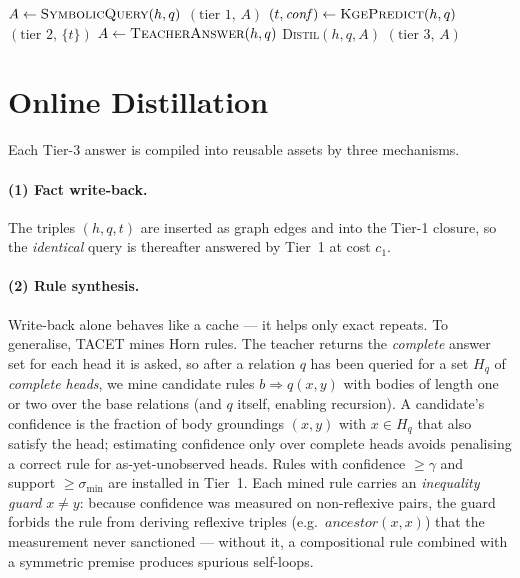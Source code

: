 \documentclass[11pt]{article}
\theoremstyle{plain}
\begin{document}
\begin{algorithm}[t]
\caption{TACET query routing with distillation}
\label{alg:route}
\begin{algorithmic}[1]
  \State $A \gets \textsc{SymbolicQuery}(h,q)$
   \Return $(\text{tier }1,\,A)$ \EndIf
  \State $(t,\mathit{conf}) \gets \textsc{KgePredict}(h,q)$
     \State \Return $(\text{tier }2,\,\{t\})$
  \EndIf
  \State $A \gets \textsc{TeacherAnswer}(h,q)$
  \State \textsc{Distil}$(h,q,A)$ 
  \State \Return $(\text{tier }3,\,A)$
\EndFunction
\end{algorithmic}
\end{algorithm}

\section{Online Distillation}
\label{sec:distill}

Each Tier-3 answer is compiled into reusable assets by three mechanisms.

\paragraph{(1) Fact write-back.} The triples $(h,q,t)$ are inserted as
graph edges and into the Tier-1 closure, so the \emph{identical} query is
thereafter answered by Tier~1 at cost $c_1$.

\paragraph{(2) Rule synthesis.} Write-back alone behaves like a cache --- it
helps only exact repeats. To generalise, TACET mines Horn rules. The
teacher returns the \emph{complete} answer set for each head it is asked, so
after a relation $q$ has been queried for a set $H_q$ of \emph{complete
heads}, we mine candidate rules $b\Rightarrow q(x,y)$ with bodies of length
one or two over the base relations (and $q$ itself, enabling recursion). A
candidate's confidence is the fraction of body groundings $(x,y)$ with
$x\in H_q$ that also satisfy the head; estimating confidence only over
complete heads avoids penalising a correct rule for as-yet-unobserved heads.
Rules with confidence $\ge\gamma$ and support $\ge\sigma_{\mathrm{min}}$ are installed in
Tier~1. Each mined rule carries an \emph{inequality guard} $x\neq y$:
because confidence was measured on non-reflexive pairs, the guard forbids
the rule from deriving reflexive triples (e.g.\ $\mathit{ancestor}(x,x)$)
that the measurement never sanctioned --- without it, a compositional rule
combined with a symmetric premise produces spurious self-loops.
\end{document}
